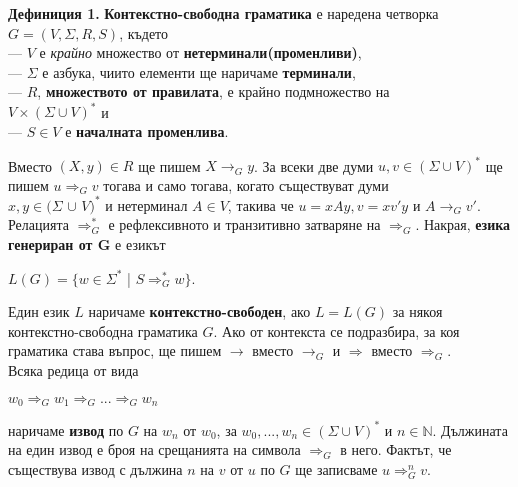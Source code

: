\documentclass[openany]{book}
\begin{document}
    \vspace{15pt}

    \textbf{Дефиниция 1.} \textbf{Контекстно-свободна граматика} е наредена четворка $G = (V,\Sigma,R,S)$, където \\
    — $V$ е \textit{крайно} множество от \textbf{нетерминали(променливи)}, \\
    — $\Sigma$ е азбука, чиито елементи ще наричаме \textbf{терминали}, \\
    — $R$, \textbf{множеството от правилата}, е крайно подмножество на \\ $V \times (\Sigma \cup V)^*$ и \\
    — $S \in V$ е \textbf{началната променлива}.

    \vspace{10pt}

    \hspace{15pt}Вместо $(X,y) \in R$ ще пишем $X \rightarrow_G y$. За всеки две думи $u,v \in (\Sigma \cup V)^*$
    ще пишем $u \Rightarrow_G v$ тогава и само тогава, когато съществуват думи \\ $x,y \in (\Sigma$ $\cup$ $V)^*$
    и нетерминал $A \in V$, такива че $u = xAy, v=xv'y$ и $A \rightarrow_G v'$.
    Релацията $\Rightarrow_G^*$ е рефлексивното и транзитивно затваряне на $\Rightarrow_G$.
    Накрая, \textbf{езика генериран от $\boldsymbol{G}$} е езикът 
    \begin{center}
        $L(G) = \{w \in \Sigma^*$ | $S \Rightarrow_G^* w\}$. 
    \end{center}
    \hspace{15pt}Един език $L$ наричаме \textbf{контекстно-свободен}, ако $L = L(G)$ за някоя контекстно-свободна граматика $G$.
    Ако от контекста се подразбира, за коя граматика става въпрос, ще пишем $\rightarrow$ 
    вместо $\rightarrow_G$ и $\Rightarrow$ вместо $\Rightarrow_G$. \\
    \vspace{20pt}
    \hspace{15pt} Всяка редица от вида
    \begin{center}
        $w_0 \Rightarrow_G w_1 \Rightarrow_G ... \Rightarrow_G w_n$
    \end{center}
    наричаме \textbf{извод} по $G$ на $w_n$ от $w_0$, за $w_0,...,w_n \in (\Sigma \cup V)^*$ и $n \in \mathbb{N}$.
    Дължината на един извод е броя на срещанията на символа $\boxed{\Rightarrow_G}$ в него.
    Фактът, че съществува извод с дължина $n$ на $v$ от $u$ по $G$ ще записваме $u \Rightarrow_G^n v$. 
    \vspace{15pt}
\end{document}
